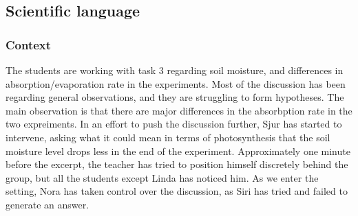 \subsection{Scientific language}
\subsubsection*{Context}
The students are working with task 3 regarding soil moisture, and differences in absorption/evaporation rate in the experiments. Most of the discussion has been regarding general observations, and they are struggling to form hypotheses. The main observation is that there are major differences in the absorbption rate in the two expreiments. In an effort to push the discussion further, Sjur has started to intervene, asking what it could mean in terms of photosynthesis that the soil moisture level drops less in the end of the experiment. Approximately one minute before the excerpt, the teacher has tried to position himself discretely behind the group, but all the students except Linda has noticed him. As we enter the setting, Nora has taken control over the discussion, as Siri has tried and failed to generate an answer. 

